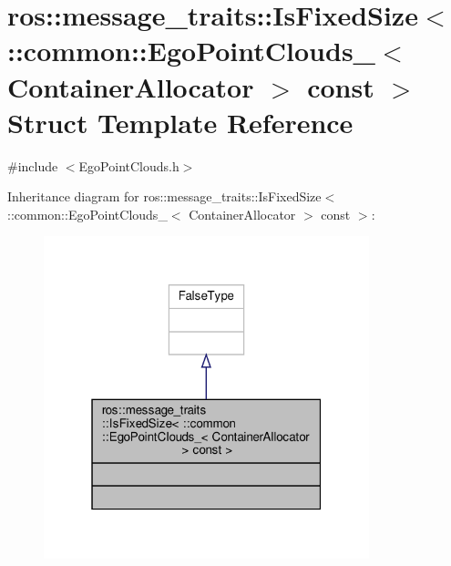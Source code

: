 \hypertarget{structros_1_1message__traits_1_1IsFixedSize_3_01_1_1common_1_1EgoPointClouds___3_01ContainerAllocator_01_4_01const_01_4}{}\section{ros\+:\+:message\+\_\+traits\+:\+:Is\+Fixed\+Size$<$ \+:\+:common\+:\+:Ego\+Point\+Clouds\+\_\+$<$ Container\+Allocator $>$ const $>$ Struct Template Reference}
\label{structros_1_1message__traits_1_1IsFixedSize_3_01_1_1common_1_1EgoPointClouds___3_01ContainerAllocator_01_4_01const_01_4}


{\ttfamily \#include $<$Ego\+Point\+Clouds.\+h$>$}



Inheritance diagram for ros\+:\+:message\+\_\+traits\+:\+:Is\+Fixed\+Size$<$ \+:\+:common\+:\+:Ego\+Point\+Clouds\+\_\+$<$ Container\+Allocator $>$ const $>$\+:\nopagebreak
\begin{figure}[H]
\begin{center}
\leavevmode
\includegraphics[width=268pt]{de/de6/structros_1_1message__traits_1_1IsFixedSize_3_01_1_1common_1_1EgoPointClouds___3_01ContainerAllo5549ad60dac45ef17d55441edcd487dd}
\end{center}
\end{figure}



